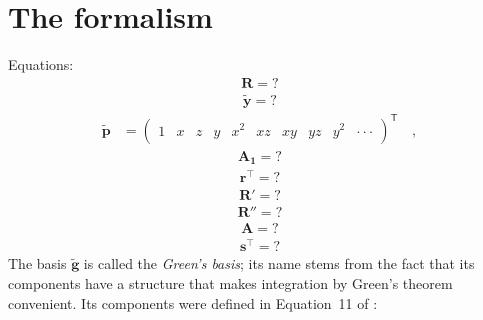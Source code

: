 \documentclass[modern]{aastex62}
\newcommand{\BF}[1]{\ensuremath{\mathbf{#1}}}
\newcommand{\sTe}{\ensuremath{\BF{s}^\top}}
\newcommand{\rTe}{\ensuremath{\BF{r}^\top}}
\newcommand{\bg}{\ensuremath{\tilde{\BF{g}}}}
\newcommand{\bp}{\ensuremath{\tilde{\BF{p}}}}
\newcommand{\by}{\ensuremath{\tilde{\BF{y}}}}
\begin{document}
\appendix


\section{The \starry formalism}
\label{app:starry}
%
Equations:
%
\begin{align}
    \label{eq:R}
    \BF{R} = ?
\end{align}
%
\begin{align}
    \label{eq:by}
    \by = ?
\end{align}
%
\begin{align}
    \label{eq:bp}
    \bp & =
    \begin{pmatrix}
        1   &
        x   & z  & y  &
        x^2 & xz & xy & yz & y^2 &
        \cdot\cdot\cdot
    \end{pmatrix}^\mathsf{T}
    \quad,
\end{align}
%
\begin{align}
    \label{eq:A1}
    \BF{A_1} = ?
\end{align}
%
\begin{align}
    \label{eq:rTe}
    \rTe = ?
\end{align}
%
\begin{align}
    \label{eq:R'}
    \BF{R}' = ?
\end{align}
%
\begin{align}
    \label{eq:R''}
    \BF{R}'' = ?
\end{align}
%
\begin{align}
    \label{eq:A}
    \BF{A} = ?
\end{align}
%
\begin{align}
    \label{eq:sTe}
    \sTe = ?
\end{align}
%
The basis $\bg$ is called the \emph{Green's basis}; its name
stems from the fact that its components have a structure that makes integration
by Green's theorem convenient. Its components were defined in
Equation~11 of \citet{Luger2019b}:
%
\end{document}
